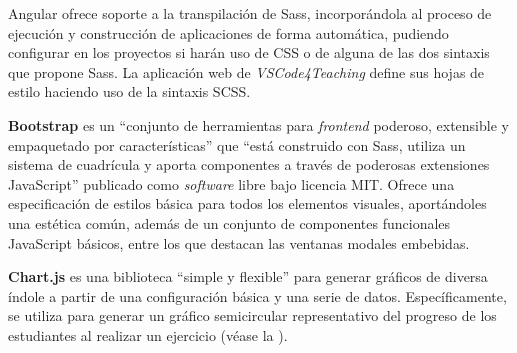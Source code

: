 Angular ofrece soporte a la transpilación de Sass, incorporándola al proceso de ejecución y construcción de aplicaciones de forma automática, pudiendo configurar en los proyectos si harán uso de CSS o de alguna de las dos sintaxis que propone Sass. La aplicación web de \textit{VSCode4Teaching} define sus hojas de estilo haciendo uso de la sintaxis SCSS.

\textbf{Bootstrap} es un ``conjunto de herramientas para \textit{frontend} poderoso, extensible y empaquetado por características'' que ``está construido con Sass, utiliza un sistema de cuadrícula y aporta componentes a través de poderosas extensiones JavaScript'' \cite{Bootstrap} publicado como \textit{software} libre bajo licencia MIT. Ofrece una especificación de estilos básica para todos los elementos visuales, aportándoles una estética común, además de un conjunto de componentes funcionales JavaScript básicos, entre los que destacan las ventanas modales embebidas.

\textbf{Chart.js} es una biblioteca ``simple y flexible'' \cite{ChartJS} para generar gráficos de diversa índole a partir de una configuración básica y una serie de datos. Específicamente, se utiliza para generar un gráfico semicircular representativo del progreso de los estudiantes al realizar un ejercicio (véase la ).
